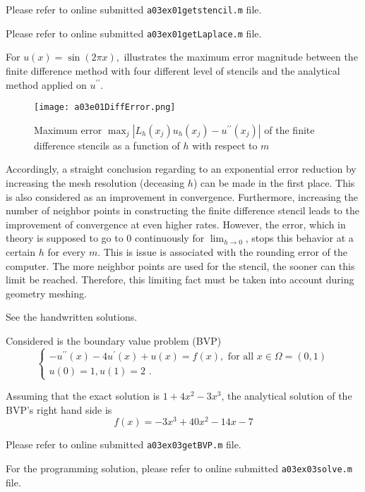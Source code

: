 %
 Please refer to online submitted \texttt{a03ex01getstencil.m} file.

%
 Please refer to online submitted \texttt{a03ex01getLaplace.m} file.

%
For $u(x) = \sin{(2\pi x)}, $\text{ } illustrates the maximum error magnitude between the finite difference method with four different level of stencils and the analytical method applied on $u^{\prime\prime}$.
\begin{figure}[H]
\vspace*{\FigUpperVSpace}
	\texttt{[image: a03e01DiffError.png]} 
	\caption{Maximum error $\max_j|L_h(x_j)u_h(x_j)-u^{\prime\prime}(x_j)|$ of the finite difference stencils as a function of $h$ with respect to $m$}
	\label{fig:a03e01DiffError}
\end{figure}
Accordingly, a straight conclusion regarding to an exponential error reduction by increasing the mesh resolution (deceasing $h$) can be made in the first place.
This is also considered as an improvement in convergence.
Furthermore, increasing the number of neighbor points in constructing the finite difference stencil leads to the improvement of convergence at even higher rates.
However, the error, which in theory is supposed to go to 0 continuously for $\lim_{h\rightarrow0}$, stops this behavior at a certain $h$ for every $m$.
This is issue is associated with the rounding error of the computer.
The more neighbor points are used for the stencil, the sooner can this limit be reached.
Therefore, this limiting fact must be taken into account during geometry meshing.

%
 See the handwritten solutions.

Considered is the boundary value problem (BVP)
\begin{equation}
	\begin{cases}
		-u^{\prime\prime}(x) - 4u^\prime(x) + u(x) = f(x), \text{ for all } x \in \Omega = (0,1) \\
		u(0)=1, u(1) = 2 \text{ .}
	\end{cases}
\end{equation}

%
Assuming that the exact solution is $1 + 4x^2 - 3x^3$, the analytical solution of the BVP's right hand side is
\begin{equation}
	f(x) = -3x^3 + 40x^2 - 14x -7
\end{equation}

%
Please refer to online submitted \texttt{a03ex03getBVP.m} file.

%
For the programming solution, please refer to online submitted \texttt{a03ex03solve.m} file.